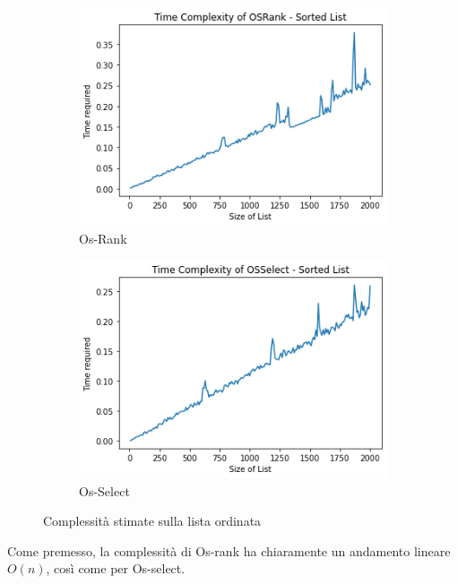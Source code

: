     \begin{figure}[h]
        \centering
        \begin{subfigure}[H]{0.4\textwidth}
            \centering
            \includegraphics[width=1\textwidth]{Images/SL-RANK.png}
            \caption{Os-Rank}
        \end{subfigure}
        \begin{subfigure}[H]{0.4\textwidth}
            \centering
            \includegraphics[width=1\textwidth]{Images/SL-SELECT.png}
            \caption{Os-Select}
        \end{subfigure}
    \caption{Complessità stimate sulla lista ordinata}
    \end{figure}

    Come premesso, la complessità di Os-rank ha chiaramente un andamento lineare $O(n)$, così come per Os-select.

